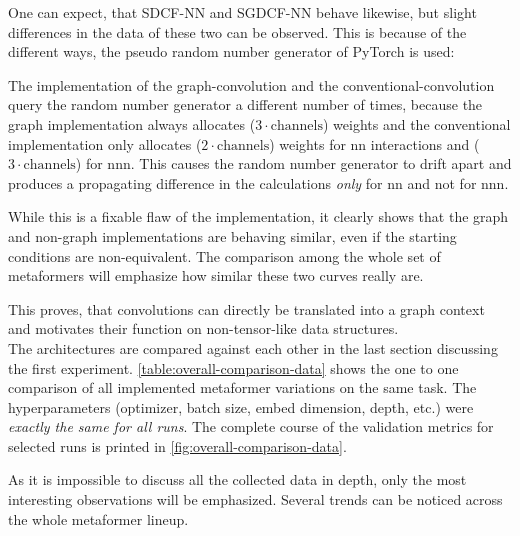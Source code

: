 One can expect, that SDCF-NN and SGDCF-NN behave likewise, but slight differences in the data of these two can be observed.
This is because of the different ways, the pseudo random number generator of PyTorch is used:
\begin{sloppypar} %
    The implementation of the graph-convolution \phantom{asdasdasdasdasdasdasdasdasdasdasdasdasd}
    and the conventional-convolution 
        \phantom{aa}
        query the random number generator a different number of times, because the graph implementation always allocates ($3 \cdot \mathrm{channels}$) weights and the conventional implementation only allocates ($2 \cdot \mathrm{channels}$) weights for nn interactions and ($3 \cdot \mathrm{channels}$) for nnn.
        This causes the random number generator to drift apart and produces a propagating difference in the calculations \emph{only} for nn and not for nnn.
\end{sloppypar}

While this is a fixable flaw of the implementation, it clearly shows that the graph and non-graph implementations are behaving similar, even if the starting conditions are non-equivalent.
The comparison among the whole set of metaformers will emphasize how similar these two curves really are.

This proves, that convolutions can directly be translated into a graph context and motivates their function on non-tensor-like data structures.\\

\FloatBarrier
The architectures are compared against each other in the last section discussing the first experiment. 
\autoref{table:overall-comparison-data} shows the one to one comparison of all implemented metaformer variations on the same task.
The hyperparameters (optimizer, batch size, embed dimension, depth, etc.) were \emph{exactly the same for all runs}. 
The complete course of the validation metrics for selected runs is printed in \autoref{fig:overall-comparison-data}.

As it is impossible to discuss all the collected data in depth, only the most interesting observations will be emphasized.
Several trends can be noticed across the whole metaformer lineup. 



